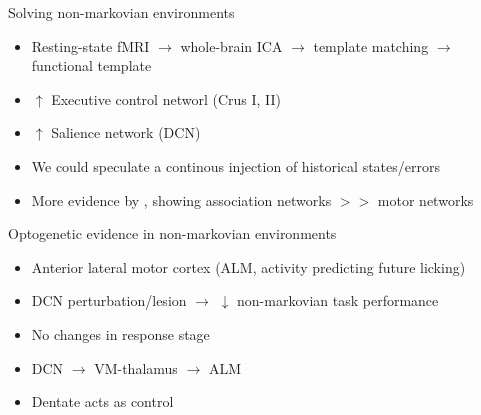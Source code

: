 \documentclass{beamer}
\begin{document}
	\begin{frame}{Solving non-markovian environments}
		\begin{itemize}
			\item Resting-state fMRI \parencite{habasDistinctCerebellarContributions2009} $\rightarrow$ whole-brain ICA $\rightarrow$ template matching $\rightarrow$ functional template \parencite{damoiseauxConsistentRestingstateNetworks2006}
			\item $\uparrow$ Executive control networl (Crus I, II)
			\item $\uparrow$ Salience network (DCN)
			\item We could speculate a continous injection of historical states/errors
			\item More evidence by \cite{bucknerOrganizationHumanCerebellum2011a}, showing association networks $>>$ motor networks
		\end{itemize}
	\end{frame}
	
	\begin{frame}{Optogenetic evidence in non-markovian environments}
	    \parencite{gaoCorticocerebellarLoopMotor2018a}
	    \begin{itemize}
	    	\item Anterior lateral motor cortex (ALM, activity predicting future licking) 
	    	\item DCN perturbation/lesion $\rightarrow$ $\downarrow$ non-markovian task performance
	    	\item No changes in response stage
	    	\item DCN $\rightarrow$ VM-thalamus $\rightarrow$ ALM
	    	\item Dentate acts as control
	    \end{itemize}
	\end{frame}
	
\end{document}
